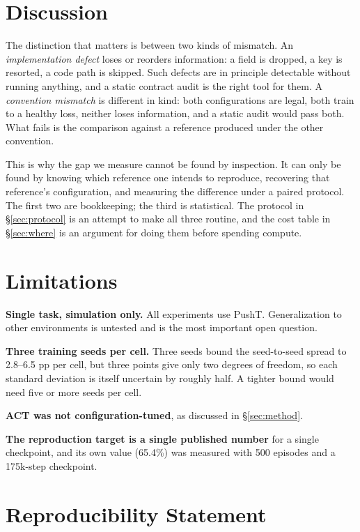 \documentclass[11pt]{article}
\begin{document}
\section{Discussion}

The distinction that matters is between two kinds of mismatch. An
\emph{implementation defect} loses or reorders information: a field is dropped, a
key is resorted, a code path is skipped. Such defects are in principle detectable
without running anything, and a static contract audit \cite{obscontract} is the
right tool for them. A \emph{convention mismatch} is different in kind: both
configurations are legal, both train to a healthy loss, neither loses information,
and a static audit would pass both. What fails is the comparison against a
reference produced under the other convention.

This is why the gap we measure cannot be found by inspection. It can only be found
by knowing which reference one intends to reproduce, recovering that reference's
configuration, and measuring the difference under a paired protocol. The first two
are bookkeeping; the third is statistical. The protocol in \S\ref{sec:protocol} is
an attempt to make all three routine, and the cost table in \S\ref{sec:where} is an
argument for doing them before spending compute.

\section{Limitations}

\textbf{Single task, simulation only.} All experiments use PushT. Generalization to
other environments is untested and is the most important open question.

\textbf{Three training seeds per cell.} Three seeds bound the seed-to-seed spread
to 2.8--6.5 pp per cell, but three points give only two degrees of freedom, so each
standard deviation is itself uncertain by roughly half. A tighter bound would need
five or more seeds per cell.

\textbf{ACT was not configuration-tuned}, as discussed in \S\ref{sec:method}.

\textbf{The reproduction target is a single published number} for a single
checkpoint, and its own value (65.4\%) was measured with 500 episodes and a
175k-step checkpoint.

\section{Reproducibility Statement}
\end{document}
